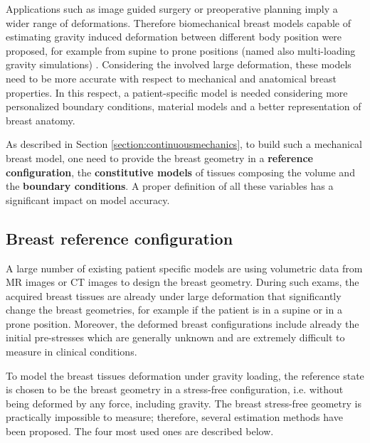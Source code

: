  Applications such as image guided surgery or preoperative planning imply a wider range of deformations. Therefore biomechanical breast models capable of estimating gravity induced deformation between different body position were proposed, for example from supine to prone positions (named also multi-loading gravity simulations) \citep{gamage_modelling_2012,georgii_simulation_2016,eiben_surface_2016} . Considering the involved large deformation, these models need to be more accurate with respect to mechanical and anatomical breast properties. In this respect, a patient-specific model is needed considering more personalized boundary conditions, material models and a better representation of breast anatomy. 

 
As described in Section \ref{section:continuousmechanics}, to build such a mechanical breast model, one need to provide the breast geometry in a \textbf{reference configuration}, the \textbf{constitutive models} of tissues composing the volume and the \textbf{boundary conditions}. A proper definition of all these variables has a significant impact on model accuracy.

\subsection{Breast reference configuration} 

A large number of existing patient specific models are using volumetric data from MR images \citep{carter_biomechanical_2009,kellner_simulation_2007, conley_realization_2015, eiben_symmetric_2016, martinez_finite_2017}  or CT images \citep{palomar_finite_2008, sturgeon_finite_element_2016} to design the breast geometry. During such exams, the acquired breast tissues are already under large deformation that significantly change the breast geometries, for example if the patient is in a supine or in a prone position. Moreover, the deformed breast configurations include already the initial pre-stresses which are generally unknown and are extremely difficult to measure in clinical conditions. 
 

To model the breast tissues deformation under gravity loading, the reference state is chosen to be the breast geometry in a stress-free configuration, i.e. without being deformed by any force, including gravity. The breast stress-free geometry is practically impossible to measure; therefore, several estimation methods have been proposed. The four most used ones are described below.

 
 
